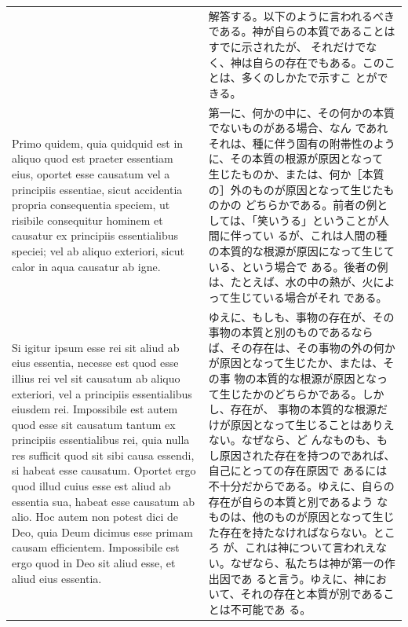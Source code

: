 \documentclass[paper=a4paper,fontsize=10pt,jafontsize=9pt,titlepage]{jlreq}
\begin{document}
\begin{longtable}{p{21em}p{21em}}
&

解答する。以下のように言われるべきである。神が自らの本質であることはすでに示されたが、
 それだけでなく、神は自らの存在でもある。このことは、多くのしかたで示すこ
 とができる。

\\

Primo quidem, quia quidquid est in aliquo quod est praeter
 essentiam eius, oportet esse causatum vel a principiis essentiae, sicut
 accidentia propria consequentia speciem, ut risibile consequitur
 hominem et causatur ex principiis essentialibus speciei; vel ab aliquo
 exteriori, sicut calor in aqua causatur ab igne.  
&

第一に、何かの中に、その何かの本質でないものがある場合、なん
 であれそれは、種に伴う固有の附帯性のように、その本質の根源が原因となって
 生じたものか、または、何か［本質の］外のものが原因となって生じたものかの
 どちらかである。前者の例としては、「笑いうる」ということが人間に伴ってい
 るが、これは人間の種の本質的な根源が原因になって生じている、という場合で
 ある。後者の例は、たとえば、水の中の熱が、火によって生じている場合がそれ
 である。

\\


Si igitur ipsum esse
 rei sit aliud ab eius essentia, necesse est quod esse illius rei vel
 sit causatum ab aliquo exteriori, vel a principiis essentialibus
 eiusdem rei.  Impossibile est autem quod esse sit causatum tantum ex
 principiis essentialibus rei, quia nulla res sufficit quod sit sibi
 causa essendi, si habeat esse causatum.  Oportet ergo quod illud cuius
 esse est aliud ab essentia sua, habeat esse causatum ab alio.  Hoc
 autem non potest dici de Deo, quia Deum dicimus esse primam causam
 efficientem.  Impossibile est ergo quod in Deo sit aliud esse, et aliud
 eius essentia.

&

ゆえに、もしも、事物の存在が、その事物の本質と別のものであるなら
 ば、その存在は、その事物の外の何かが原因となって生じたか、または、その事
 物の本質的な根源が原因となって生じたかのどちらかである。しかし、存在が、
 事物の本質的な根源だけが原因となって生じることはありえない。なぜなら、ど
 んなものも、もし原因された存在を持つのであれば、自己にとっての存在原因で
 あるには不十分だからである。ゆえに、自らの存在が自らの本質と別であるよう
 なものは、他のものが原因となって生じた存在を持たなければならない。ところ
 が、これは神について言われえない。なぜなら、私たちは神が第一の作出因であ
 ると言う。ゆえに、神において、それの存在と本質が別であることは不可能であ
 る。


\end{longtable}
\end{document}
